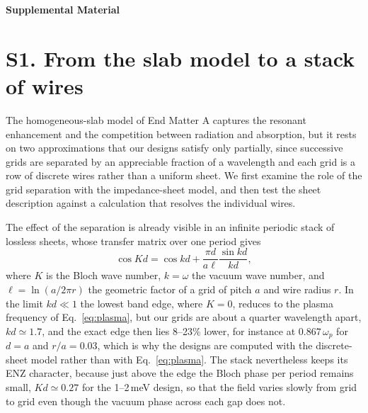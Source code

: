 \documentclass[
  aps,prl,reprint,superscriptaddress,
  amsmath,amssymb,floatfix,nofootinbib
]{revtex4-2}
\begin{document}
\onecolumngrid
\begin{center}{\large\bfseries Supplemental Material}\end{center}
\twocolumngrid
\setcounter{equation}{0}
\setcounter{figure}{0}
\renewcommand{\theequation}{S\arabic{equation}}
\renewcommand{\theHequation}{S.\arabic{equation}}
\renewcommand{\thefigure}{S\arabic{figure}}

\section*{S1. From the slab model to a stack of wires}

The homogeneous-slab model of End Matter A captures the resonant enhancement and the competition between radiation and absorption, but it rests on two approximations that our designs satisfy only partially, since successive grids are separated by an appreciable fraction of a wavelength and each grid is a row of discrete wires rather than a uniform sheet. We first examine the role of the grid separation with the impedance-sheet model, and then test the sheet description against a calculation that resolves the individual wires.

The effect of the separation is already visible in an infinite periodic stack of lossless sheets, whose transfer matrix over one period gives~\cite{Brillouin:1946,Collin:1991}
\begin{equation}
\cos Kd=\cos kd+\frac{\pi d}{a\ell}\frac{\sin kd}{kd},
\end{equation}
where $K$ is the Bloch wave number, $k=\omega$ the vacuum wave number, and $\ell=\ln(a/2\pi r)$ the geometric factor of a grid of pitch $a$ and wire radius $r$. In the limit $kd\ll1$ the lowest band edge, where $K=0$, reduces to the plasma frequency of Eq.~\eqref{eq:plasma}, but our grids are about a quarter wavelength apart, $kd\simeq1.7$, and the exact edge then lies 8--23\% lower, for instance at $0.867\,\omega_p$ for $d=a$ and $r/a=0.03$, which is why the designs are computed with the discrete-sheet model rather than with Eq.~\eqref{eq:plasma}. The stack nevertheless keeps its ENZ character, because just above the edge the Bloch phase per period remains small, $Kd\simeq0.27$ for the 1--2\,meV design, so that the field varies slowly from grid to grid even though the vacuum phase across each gap does not.
\end{document}
